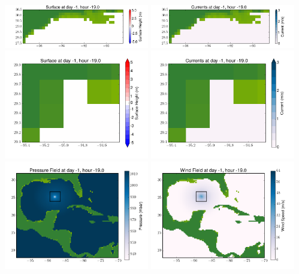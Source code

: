 \documentclass[11pt]{article}
\begin{document}
\includegraphics[width=0.475\textwidth]{frame0029fig4.png}
\vskip 10pt 
\includegraphics[width=0.475\textwidth]{frame0029fig5.png}
\includegraphics[width=0.475\textwidth]{frame0029fig6.png}
\vskip 10pt 
\includegraphics[width=0.475\textwidth]{frame0029fig7.png}
\includegraphics[width=0.475\textwidth]{frame0029fig8.png}
\vskip 10pt 
\includegraphics[width=0.475\textwidth]{frame0029fig9.png}
\end{document}
